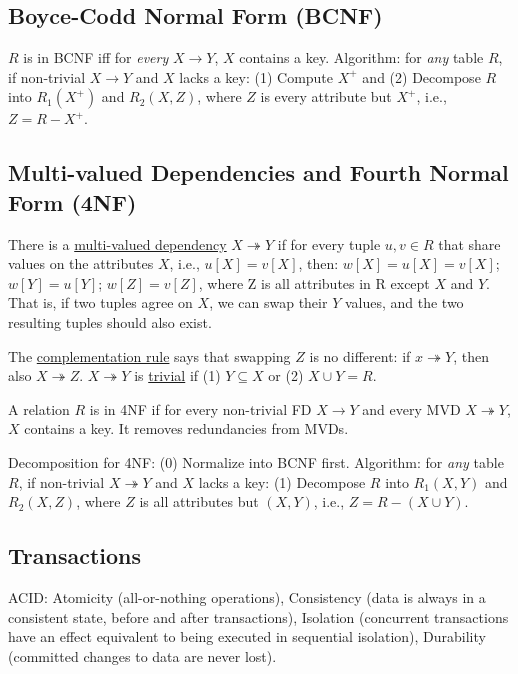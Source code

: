\documentclass[10pt,letterpaper,twocolumn]{article}
\newcommand{\tto}{\twoheadrightarrow}
\begin{document}
\subsection{Boyce-Codd Normal Form (BCNF)}

$ R $ is in BCNF iff for \textit{every} $ X \to Y $, 
$ X $ contains a key. Algorithm: for \textit{any} 
table $ R $, if non-trivial $ X \to Y $ and $ X $
lacks a key: (1) Compute $ X^+ $ and (2) Decompose
$ R $ into $ R_1(X^+) $ and $ R_2(X, Z) $, where 
$ Z $ is every attribute but $ X^+ $, i.e., 
$ Z = R - X^+ $.


\subsection{Multi-valued Dependencies and Fourth Normal Form (4NF)}

There is a \underline{multi-valued dependency} 
$ X \tto Y $ 
if for every tuple $ u, v \in R $ that share values
on the attributes $ X $, i.e., $ u[X] = v[X] $, 
then: $ w[X] = u[X] = v[X] $; \; $ w[Y] = u[Y] $; \;
$ w[Z] = v[Z] $, where Z is all attributes
in R except $ X $ and $ Y $. That is, if two 
tuples agree on $ X $, we can swap their $ Y $ values,
and the two resulting tuples should also exist. 

The \underline{complementation rule} says that 
swapping $ Z $ is no different: if $ x \tto Y $, 
then also $ X \tto Z $. $ X \tto Y $ is 
\underline{trivial} if (1) $ Y \subseteq X $ or (2) 
$ X \cup Y = R $.

A relation $ R $ is in 4NF if for every non-trivial
FD $ X \to Y $ and every MVD $ X \tto Y $, $ X $ 
contains a key. It removes redundancies from MVDs.

Decomposition for 4NF: (0) Normalize into BCNF first. 
Algorithm: for \textit{any} table $ R $, if non-trivial
$ X \tto Y $ and $ X $ lacks a key: (1) Decompose $ R $ 
into $ R_1(X,Y) $ and $ R_2(X,Z) $, where $ Z $ is
all attributes but $ (X, Y) $, i.e., $ Z = R - (X \cup Y) $.


\subsection{Transactions}

ACID: Atomicity (all-or-nothing operations), 
Consistency (data is always in a consistent state, 
before and after transactions), Isolation (concurrent
transactions have an effect equivalent to being 
executed in sequential isolation), Durability 
(committed changes to data are never lost).
\end{document}
